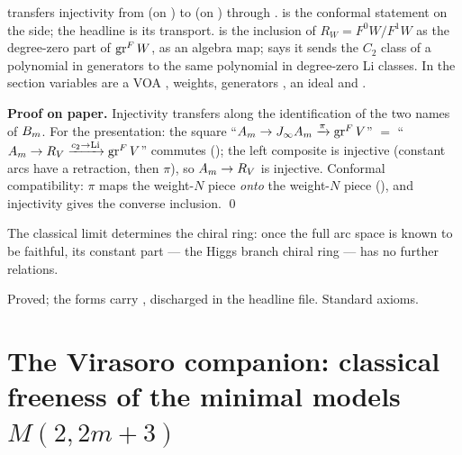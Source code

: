\begin{dictionary}
 transfers injectivity from  (on ) to
 (on ) through .
 is the conformal statement on the  side; the headline
 is its transport.  is the
inclusion of $R_W=F^0W/F^1W$ as the degree-zero part of $\operatorname{gr}^F W$, as an algebra map;  says it
sends the $C_2$ class of a polynomial in generators to the same polynomial in degree-zero Li classes. In
 the section variables are a VOA , weights, generators , an
ideal  and .
\end{dictionary}

\textbf{Proof on paper.} Injectivity transfers along the identification of the two names of $B_m$. For the presentation:
the square ``$A_m\to J_\infty A_m\xrightarrow\pi\operatorname{gr}^F V$'' $=$ ``$A_m\to R_V\xrightarrow{c_2\to\mathrm{Li}}\operatorname{gr}^F V$''
commutes (); the left composite is injective (constant arcs have a retraction, then $\pi$),
so $A_m\to R_V$ is injective. Conformal compatibility: $\pi$ maps the weight-$N$ piece \emph{onto} the weight-$N$ piece
(), and injectivity gives the converse inclusion. \qed

\begin{physics}
The classical limit determines the chiral ring: once the full arc space is known to be faithful, its constant part ---
the Higgs branch chiral ring --- has no further relations.
\end{physics}

\begin{status}
Proved; the  forms carry , discharged in the headline file. Standard axioms.
\end{status}

\section{The Virasoro companion: classical freeness of the minimal models \texorpdfstring{$M(2,2m+3)$}{M(2,2m+3)}}\label{l20:sec:vir}

